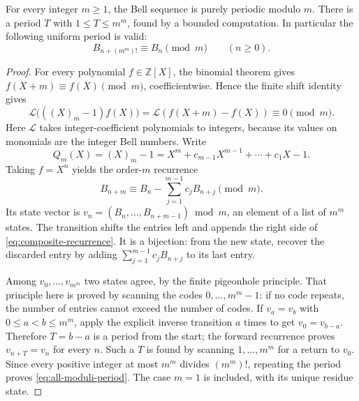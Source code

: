 \begin{theorem}
\label{thm:all-moduli-period}
For every integer $m\geq1$, the Bell sequence is purely periodic modulo $m$.
There is a period $T$ with $1\leq T\leq m^m$, found by a bounded computation.
In particular the following uniform period is valid:
\begin{equation}\label{eq:all-moduli-period}
 B_{n+(m^m)!}\equiv B_n\pmod m\qquad(n\geq0).
\end{equation}
\end{theorem}
\begin{proof}
For every polynomial $f\in\mathbb Z[X]$, the binomial theorem gives
$f(X+m)\equiv f(X)\pmod m$, coefficientwise. Hence the finite shift identity
gives
\[
 \mathcal L\bigl(((X)_m-1)f(X)\bigr)
   =\mathcal L(f(X+m)-f(X))\equiv0\pmod m.
\]
Here $\mathcal L$ takes integer-coefficient polynomials to integers, because
its values on monomials are the integer Bell numbers. Write
\[
 Q_m(X)=(X)_m-1=X^m+c_{m-1}X^{m-1}+\cdots+c_1X-1.
\]
Taking $f=X^n$ yields the order-$m$ recurrence
\begin{equation}\label{eq:composite-recurrence}
 B_{n+m}\equiv B_n-\sum_{j=1}^{m-1}c_jB_{n+j}\pmod m.
\end{equation}
Its state vector is
$v_n=(B_n,\ldots,B_{n+m-1})\bmod m$, an element of a list of $m^m$ states.
The transition shifts the entries left and appends the right side of
\eqref{eq:composite-recurrence}. It is a bijection: from the new state,
recover the discarded entry by adding
$\sum_{j=1}^{m-1}c_jB_{n+j}$ to its last entry.

Among $v_0,\ldots,v_{m^m}$ two states agree, by the finite pigeonhole
principle. That principle here is proved by scanning the codes
$0,\ldots,m^m-1$: if no code repeats, the number of entries cannot exceed the
number of codes. If $v_a=v_b$ with $0\leq a<b\leq m^m$, apply the explicit
inverse transition $a$ times to get $v_0=v_{b-a}$. Therefore
$T=b-a$ is a period from the start; the forward recurrence proves
$v_{n+T}=v_n$ for every $n$. Such a $T$ is found by scanning
$1,\ldots,m^m$ for a return to $v_0$. Since every positive integer at most
$m^m$ divides $(m^m)!$, repeating the period proves
\eqref{eq:all-moduli-period}. The case $m=1$ is included, with its unique
residue state.
\end{proof}

